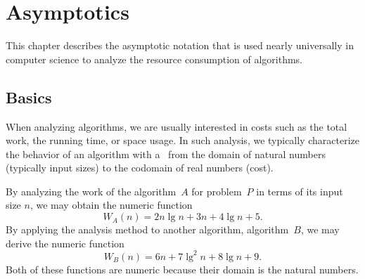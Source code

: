 \chapter{Asymptotics}
\label{ch:analysis::asymptotics}




\begin{preamble}
This chapter describes the asymptotic notation that is used nearly
universally in computer science to analyze the resource consumption of
algorithms.
\end{preamble}

\section{Basics}
\label{sec:analysis::asymptotics::asymptotics}

\begin{flex}

  \begin{gram}
When analyzing algorithms, we are usually interested in
costs such as the total work, the running time, or space usage. 
%
In such analysis, we typically characterize the behavior of an
algorithm with a~ from the domain of natural
numbers (typically input sizes) to the codomain of real numbers (cost).
%
%
\end{gram}

\begin{example}
By analyzing the work of the algorithm~$A$ for problem~$P$ in terms of
its input size $n$, we may obtain the numeric function
%
$$W_A(n) = 2n\lg{n} + 3n + 4\lg{n} + 5.$$  
%
By applying the analysis method to another algorithm, algorithm~$B$,
we may derive the numeric function
%
$$ W_B(n) = 6n + 7\lg^2{n} + 8\lg{n} + 9.$$
%
Both of these functions are numeric because their domain is the natural
numbers.
\end{example}

\end{flex}

